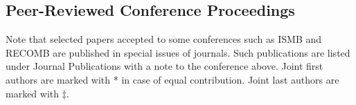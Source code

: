 \vspace{-.4cm}
\subsection{\small \sc  Peer-Reviewed Conference Proceedings}
\vspace{-.4cm}
       {\small
Note that selected papers accepted to some conferences such as ISMB and RECOMB are published
in special issues of journals. Such publications are listed under Journal Publications with a note to the conference above.
Joint first authors are marked with * in case of equal contribution.
Joint last authors are marked with $\ddag$.
}





